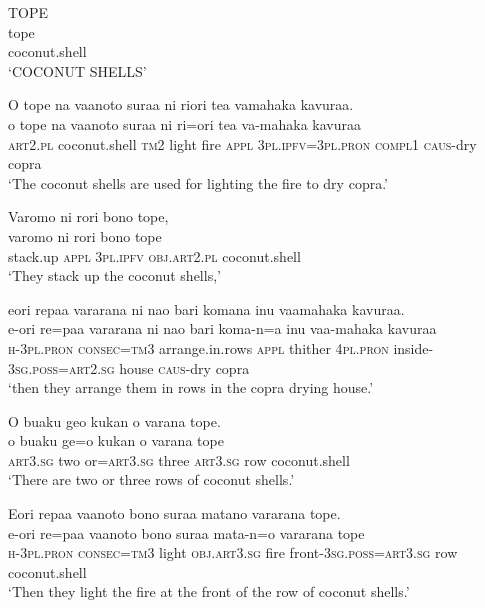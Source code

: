 \ea\label{ex:text01-88}
TOPE\\
\gll tope\\
     coconut.shell\\
\glt `COCONUT SHELLS'
\z

\ea\label{ex:text01-89}
O tope na vaanoto suraa ni riori tea vamahaka kavuraa.\\
\gll o	tope	na	vaanoto	suraa	ni	ri=ori	tea	va-mahaka	kavuraa\\
     \textsc{art}2.\textsc{pl}	coconut.shell	\textsc{tm}2	light	fire	\textsc{appl}	3\textsc{pl}.\textsc{ipfv}=3\textsc{pl}.\textsc{pron}	\textsc{compl}1	\textsc{caus}-dry	copra\\
\glt `The coconut shells are used for lighting the fire to dry copra.'
\z

\ea\label{ex:text01-90}
Varomo ni rori bono tope,\\
\gll varomo	ni	rori	bono	tope\\
     stack.up	\textsc{appl}	3\textsc{pl}.\textsc{ipfv}	\textsc{obj}.\textsc{art}2.\textsc{pl}	coconut.shell\\
\glt `They stack up the coconut shells,'
\z

\ea\label{ex:text01-91}
eori repaa vararana ni nao bari komana inu vaamahaka kavuraa.\\
\gll e-ori	re=paa	vararana	ni	nao	bari	koma-n=a	inu	vaa-mahaka	kavuraa\\
     \textsc{h}-3\textsc{pl}.\textsc{pron}	\textsc{consec}=\textsc{tm}3	arrange.in.rows	\textsc{appl}	thither	4\textsc{pl}.\textsc{pron}	inside-3\textsc{sg}.\textsc{poss}=\textsc{art}2.\textsc{sg}	house	\textsc{caus}-dry	copra\\
\glt `then they arrange them in rows in the copra drying house.'
\z

\ea\label{ex:text01-92}
O buaku geo kukan o varana tope.\\
\gll o	buaku	ge=o	kukan	o	varana	tope\\
     \textsc{art}3.\textsc{sg}	two	or=\textsc{art}3.\textsc{sg}	three	\textsc{art}3.\textsc{sg}	row	coconut.shell\\
\glt `There are two or three rows of coconut shells.'
\z

\ea\label{ex:text01-93}
Eori repaa vaanoto bono suraa matano vararana tope.\\
\gll e-ori	re=paa	vaanoto	bono	suraa	mata-n=o	vararana	tope\\
     \textsc{h}-3\textsc{pl}.\textsc{pron}	\textsc{consec}=\textsc{tm}3	light	\textsc{obj}.\textsc{art}3.\textsc{sg}	fire	front-3\textsc{sg}.\textsc{poss}=\textsc{art}3.\textsc{sg}	row	coconut.shell\\
\glt `Then they light the fire at the front of the row of coconut shells.'
\z

